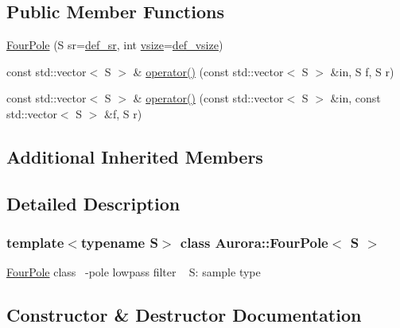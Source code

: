 \subsection*{Public Member Functions}
\begin{DoxyCompactItemize}
\item 
\hyperlink{class_aurora_1_1_four_pole_acd6f1e5b94bdc248e8e955f4ef8f7dcc}{Four\+Pole} (S sr=\hyperlink{namespace_aurora_ad49263d809bea98dd422e95bc91bc03e}{def\+\_\+sr}, int \hyperlink{class_aurora_1_1_snd_base_af9e21aaf411b17f7a8221c991ce5d291}{vsize}=\hyperlink{namespace_aurora_afaaddf667a06e7ce23c667a8b7295263}{def\+\_\+vsize})
\item 
const std\+::vector$<$ S $>$ \& \hyperlink{class_aurora_1_1_four_pole_ac3cfee8b5d8f0bf8d0b0c6784eb81fef}{operator()} (const std\+::vector$<$ S $>$ \&in, S f, S r)
\item 
const std\+::vector$<$ S $>$ \& \hyperlink{class_aurora_1_1_four_pole_a300ec87b54b5e8c5c76c1005fe31c9d9}{operator()} (const std\+::vector$<$ S $>$ \&in, const std\+::vector$<$ S $>$ \&f, S r)
\end{DoxyCompactItemize}
\subsection*{Additional Inherited Members}


\subsection{Detailed Description}
\subsubsection*{template$<$typename S$>$\newline
class Aurora\+::\+Four\+Pole$<$ S $>$}

\hyperlink{class_aurora_1_1_four_pole}{Four\+Pole} class ~-\/pole lowpass filter ~\newline
S\+: sample type 

\subsection{Constructor \& Destructor Documentation}
\mbox{\label{class_aurora_1_1_four_pole_acd6f1e5b94bdc248e8e955f4ef8f7dcc}} 
